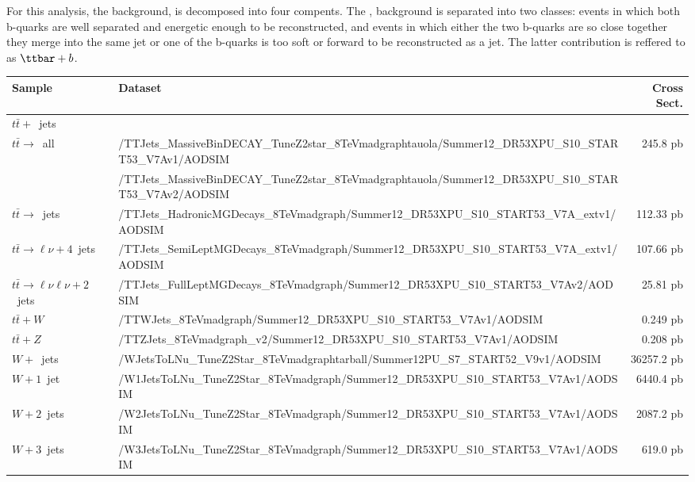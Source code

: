 \par  For this analysis, the \ttjets background, is decomposed into
four compents.  The \ttbb, background is separated into two classes:
\ttbb events in which both b-quarks are well separated and energetic
enough to be reconstructed, and events in which either the two
b-quarks are so close together they merge into the same jet or one of
the b-quarks is too soft or forward to be reconstructed as a jet.  The
latter contribution is reffered to as $\ttbar+b$. 

\begin{table}[hbtp]\footnotesize
\centering
\begin{tabular}{|p{}|p{}|r|}
\hline\hline
Sample & Dataset & Cross Sect. \\
\hline
$t\bar{t}+$~jets & & \\
$t\bar{t}\rightarrow$~all & /TTJets\_MassiveBinDECAY\_TuneZ2star\_8TeV\-madgraph\-tauola/Summer12\_DR53X\-PU\_S10\_START53\_V7A\-v1/AODSIM & 245.8 pb \\
 & /TTJets\_MassiveBinDECAY\_TuneZ2star\_8TeV\-madgraph\-tauola/Summer12\_DR53X\-PU\_S10\_START53\_V7A\-v2/AODSIM & \\
$t\bar{t}\rightarrow$~jets & /TTJets\_HadronicMGDecays\_8TeV\-madgraph/Summer12\_DR53X\-PU\_S10\_START53\_V7A\_ext\-v1/AODSIM & 112.33 pb \\
$t\bar{t}\rightarrow\ell\nu+4$~jets & /TTJets\_SemiLeptMGDecays\_8TeV\-madgraph/Summer12\_DR53X\-PU\_S10\_START53\_V7A\_ext\-v1/AODSIM & 107.66 pb \\
$t\bar{t}\rightarrow\ell\nu\ell\nu+2$~jets & /TTJets\_FullLeptMGDecays\_8TeV\-madgraph/Summer12\_DR53X\-PU\_S10\_START53\_V7A\-v2/AODSIM & 25.81 pb \\
\hline
$t\bar{t}+W$ & /TTWJets\_8TeV\-madgraph/Summer12\_DR53X\-PU\_S10\_START53\_V7A\-v1/AODSIM & 0.249 pb \\
\hline
$t\bar{t}+Z$ & /TTZJets\_8TeV\-madgraph\_v2/Summer12\_DR53X\-PU\_S10\_START53\_V7A\-v1/AODSIM & 0.208 pb \\
\hline
$W+$~jets & /WJetsToLNu\_TuneZ2Star\_8TeV\-madgraph\-tarball/Summer12\-PU\_S7\_START52\_V9\-v1/AODSIM & 36257.2 pb \\
$W+1$~jet & /W1JetsToLNu\_TuneZ2Star\_8TeV\-madgraph/Summer12\_DR53X\-PU\_S10\_START53\_V7A\-v1/AODSIM  & 6440.4 pb \\
$W+2$~jets & /W2JetsToLNu\_TuneZ2Star\_8TeV\-madgraph/Summer12\_DR53X\-PU\_S10\_START53\_V7A\-v1/AODSIM & 2087.2 pb \\
$W+3$~jets & /W3JetsToLNu\_TuneZ2Star\_8TeV\-madgraph/Summer12\_DR53X\-PU\_S10\_START53\_V7A\-v1/AODSIM & 619.0 pb \\

\end{tabular}
\end{table}
